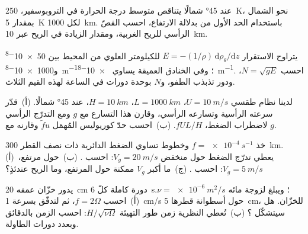 \begin{exercise}[$\star$]\label{exo:b3:gfd-foundations:3}
عند \ang{45} شمالًا يتناقص متوسط درجة الحرارة في التروبوسفير، \qty{250}{K}،
نحو الشمال بمقدار \qty{5}{K} لكل \qty{1000}{km}. باستخدام الحد الأول من
 بدلالة الارتفاع، احسب القصّ الرأسي للريح الغربية،
ومقدار الزيادة في الريح عبر \qty{10}{km}.
\end{exercise}

\begin{exercise}[$\star$]\label{exo:b3:gfd-foundations:4}
يتراوح الاستقرار $E = -(1/\rho)\,\mathrm d\rho_\theta/\mathrm dz$ للكيلومتر العلوي من
المحيط بين \num{50e-8} و\qty{1000e-8}{m^{-1}}؛
وفي الخنادق العميقة يساوي \qty{e-8}{m^{-1}}. احسب $N = \sqrt{gE}$،
ودور تذبذب الطفو، و$N$ بوحدة دورات في الساعة لهذه
القيم الثلاث.
\end{exercise}

\begin{exercise}[$\star\star$]\label{exo:b3:gfd-foundations:5}
لدينا نظام طقسي $U = \qty{10}{m/s}$، $L = \qty{1000}{km}$، $H =
\qty{10}{km}$، عند \ang{45} شمالًا. (أ)~قدّر سرعته الرأسية وتسارعه الرأسي،
وقارن هذا التسارع مع $g$ ومع
التدرّج الرأسي لاضطراب الضغط، $fUL/H$. (ب)~احسب
حدّ كوريوليس المُهمَل $\tilde fu$ وقارنه مع $g$.
\end{exercise}

\begin{exercise}[$\star\star$]\label{exo:b3:gfd-foundations:6}
خذ $f = \qty{e-4}{s^{-1}}$ وخطوط تساوي الضغط الدائرية ذات نصف القطر
\qty{300}{km}. (أ)~يعطي تدرّج الضغط حول منخفض $V_g =
\qty{20}{m/s}$: احسب . (ب)~حول مرتفع،
$V_g = \qty{5}{m/s}$: احسب . (ج)~ما أكبر
$V_g$ ممكنة حول المرتفع، وما الريح عندئذٍ؟
\end{exercise}

\begin{exercise}[$\star\star$]\label{exo:b3:gfd-foundations:7}
يدور خزّان عمقه \qty{20}{cm} دورة كاملة كلّ \qty{6}{s}؛ ويبلغ لزوجة مائه $\nu =
\qty{e-6}{m^2/s}$. (أ)~احسب $f = 2\Omega$، ثم  لتدفّق
بسرعة \qty{1}{cm/s} حول أسطوانة قطرها \qty{5}{cm}، 
للخزّان. هل سيتشكّل ؟ (ب)~تُعطي النظرية زمن طور التهيئة
$H/\sqrt{\nu\Omega}$: احسب الزمن بالدقائق وبعدد دورات الطاولة.
\end{exercise}

